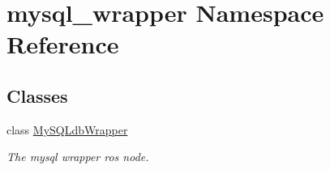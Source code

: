 \hypertarget{namespacemysql__wrapper}{\section{mysql\-\_\-wrapper Namespace Reference}
\label{namespacemysql__wrapper}
}
\subsection*{Classes}
\begin{DoxyCompactItemize}
\item 
class \hyperlink{classmysql__wrapper_1_1MySQLdbWrapper}{My\-S\-Q\-Ldb\-Wrapper}
\begin{DoxyCompactList}\small\item\em The mysql wrapper ros node. \end{DoxyCompactList}\end{DoxyCompactItemize}
